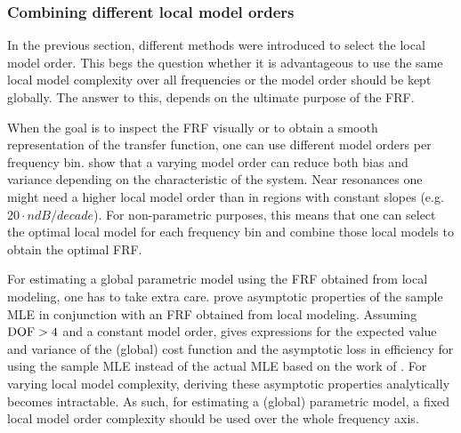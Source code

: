 \subsubsection{Combining different local model orders}
In the previous section, different methods were introduced to select the local model order.
This begs the question whether it is advantageous to use the same local model complexity over all frequencies or the model order should be kept globally.
The answer to this, depends on the ultimate purpose of the \gls{FRF}.

When the goal is to inspect the \gls{FRF} visually or to obtain a smooth representation of the transfer function, one can use different model orders per frequency bin.
 show that a varying model order can reduce both bias and variance depending on the characteristic of the system.
Near resonances one might need a higher local model order than in regions with constant slopes (e.g. $20\cdot n \unit{dB/decade}$).
For non-parametric purposes, this means that one can select the optimal local model for each frequency bin and combine those local models to obtain the optimal \gls{FRF}.

For estimating a global parametric model using the \gls{FRF} obtained from local modeling, one has to take extra care.
 prove asymptotic properties of the sample \gls{MLE} in conjunction with an \gls{FRF} obtained from local modeling.
Assuming $\mathrm{DOF} > 4$ and a constant model order, \citet{Pintelon2010LPM2} gives expressions for the expected value and variance of the (global) cost function and the asymptotic loss in efficiency for using the sample \gls{MLE} instead of the actual \gls{MLE} based on the work of \citet{Mahata2006}.
For varying local model complexity, deriving these asymptotic properties analytically becomes intractable.
As such, for estimating a (global) parametric model, a fixed local model order complexity should be used over the whole frequency axis.

